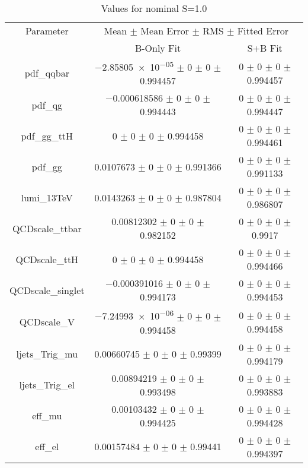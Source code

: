 \begin{table}
\centering
\caption{Values for nominal S=1.0}
\begin{tabular}{ccc}
\toprule
Parameter 	& \multicolumn{2}{c}{Mean $\pm$ Mean Error $\pm$ RMS $\pm$ Fitted Error}\\
 	& B-Only Fit & S+B Fit\\
\midrule
pdf\_qqbar 	& \num{-2.85805e-05} $\pm$ \num{0} $\pm$ \num{0} $\pm$ \num{0.994457} 	& \num{0} $\pm$ \num{0} $\pm$ \num{0} $\pm$ \num{0.994457}\\
pdf\_qg 	& \num{-0.000618586} $\pm$ \num{0} $\pm$ \num{0} $\pm$ \num{0.994443} 	& \num{0} $\pm$ \num{0} $\pm$ \num{0} $\pm$ \num{0.994447}\\
pdf\_gg\_ttH 	& \num{0} $\pm$ \num{0} $\pm$ \num{0} $\pm$ \num{0.994458} 	& \num{0} $\pm$ \num{0} $\pm$ \num{0} $\pm$ \num{0.994461}\\
pdf\_gg 	& \num{0.0107673} $\pm$ \num{0} $\pm$ \num{0} $\pm$ \num{0.991366} 	& \num{0} $\pm$ \num{0} $\pm$ \num{0} $\pm$ \num{0.991133}\\
lumi\_13TeV 	& \num{0.0143263} $\pm$ \num{0} $\pm$ \num{0} $\pm$ \num{0.987804} 	& \num{0} $\pm$ \num{0} $\pm$ \num{0} $\pm$ \num{0.986807}\\
QCDscale\_ttbar 	& \num{0.00812302} $\pm$ \num{0} $\pm$ \num{0} $\pm$ \num{0.982152} 	& \num{0} $\pm$ \num{0} $\pm$ \num{0} $\pm$ \num{0.9917}\\
QCDscale\_ttH 	& \num{0} $\pm$ \num{0} $\pm$ \num{0} $\pm$ \num{0.994458} 	& \num{0} $\pm$ \num{0} $\pm$ \num{0} $\pm$ \num{0.994466}\\
QCDscale\_singlet 	& \num{-0.000391016} $\pm$ \num{0} $\pm$ \num{0} $\pm$ \num{0.994173} 	& \num{0} $\pm$ \num{0} $\pm$ \num{0} $\pm$ \num{0.994453}\\
QCDscale\_V 	& \num{-7.24993e-06} $\pm$ \num{0} $\pm$ \num{0} $\pm$ \num{0.994458} 	& \num{0} $\pm$ \num{0} $\pm$ \num{0} $\pm$ \num{0.994458}\\
ljets\_Trig\_mu 	& \num{0.00660745} $\pm$ \num{0} $\pm$ \num{0} $\pm$ \num{0.99399} 	& \num{0} $\pm$ \num{0} $\pm$ \num{0} $\pm$ \num{0.994179}\\
ljets\_Trig\_el 	& \num{0.00894219} $\pm$ \num{0} $\pm$ \num{0} $\pm$ \num{0.993498} 	& \num{0} $\pm$ \num{0} $\pm$ \num{0} $\pm$ \num{0.993883}\\
eff\_mu 	& \num{0.00103432} $\pm$ \num{0} $\pm$ \num{0} $\pm$ \num{0.994425} 	& \num{0} $\pm$ \num{0} $\pm$ \num{0} $\pm$ \num{0.994428}\\
eff\_el 	& \num{0.00157484} $\pm$ \num{0} $\pm$ \num{0} $\pm$ \num{0.99441} 	& \num{0} $\pm$ \num{0} $\pm$ \num{0} $\pm$ \num{0.994397}\\

\end{tabular}
\end{table}
